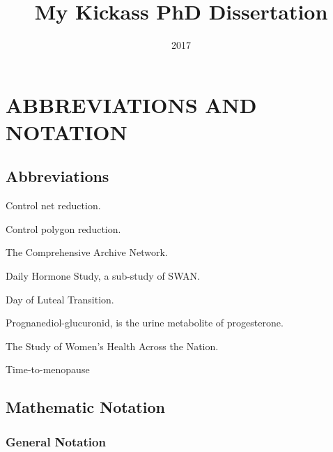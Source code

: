 \documentclass[english,10pt]{ucdenver-dissertation-coadvisors}
\title{My Kickass PhD Dissertation}
\date{2017}
\begin{document}






\renewcommand\bibname{REFERENCES}
\singlespacing

\nocite{*}



\doublespacing

\ucdappendix

\chapter{\uppercase{Abbreviations and Notation} \label{appendix-notation}}

\section{Abbreviations}

\begin{description}[leftmargin=!,labelwidth=0.5in,font=\normalfont]
  \item[CNR]  Control net reduction.
  \item[CPR]  Control polygon reduction.
  \item[CRAN] The Comprehensive  Archive Network.
  \item[DHS]  Daily Hormone Study, a sub-study of SWAN.
  \item[DLT]  Day of Luteal Transition.
  \item[PDG]  Prognanediol-glucuronid, is the urine metabolite of progesterone.
  \item[SWAN] The Study of Women's Health Across the Nation.  
  \item[TTM]  Time-to-menopause
\end{description}

\section{Mathematic Notation}

\subsection{General Notation}
\end{document}
